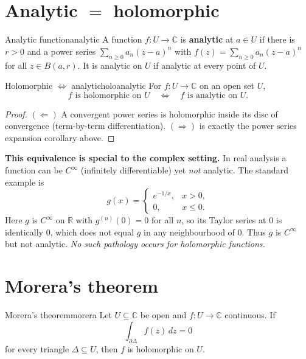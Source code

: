 \documentclass[11pt,openany]{report}
\newcommand{\C}{\mathbb{C}}
\newcommand{\R}{\mathbb{R}}
\begin{document}
\section{Analytic \texorpdfstring{$=$}{=} holomorphic}

\begin{definition}{Analytic function}{analytic}
A function $f:U\to\C$ is \textbf{analytic} at $a\in U$ if there is $r>0$ and a power series
$\sum_{n\ge0}a_n(z-a)^n$ with $f(z)=\sum_{n\ge0}a_n(z-a)^n$ for all $z\in B(a,r)$. It is
analytic on $U$ if analytic at every point of $U$.
\end{definition}

\begin{theorem}{Holomorphic $\Longleftrightarrow$ analytic}{holoanalytic}
For $f:U\to\C$ on an open set $U$,
\[
  f \text{ is holomorphic on } U \quad\Longleftrightarrow\quad f \text{ is analytic on } U .
\]
\end{theorem}

\begin{proof}
$(\Leftarrow)$ A convergent power series is holomorphic inside its disc of convergence
(term-by-term differentiation). $(\Rightarrow)$ is exactly the power series expansion
corollary above.
\end{proof}

\begin{caution}
\textbf{This equivalence is special to the complex setting.} In real analysis a function
can be $C^\infty$ (infinitely differentiable) yet \emph{not} analytic. The standard
example is
\[
  g(x) =
  \begin{cases}
    e^{-1/x}, & x>0,\\
    0, & x\le0.
  \end{cases}
\]
Here $g$ is $C^\infty$ on $\R$ with $g^{(n)}(0)=0$ for all $n$, so its Taylor series at $0$
is identically $0$, which does not equal $g$ in any neighbourhood of $0$. Thus $g$ is
$C^\infty$ but not analytic. \emph{No such pathology occurs for holomorphic functions.}
\end{caution}

\section{Morera's theorem}

\begin{theorem}{Morera's theorem}{morera}
Let $U\subseteq\C$ be open and $f:U\to\C$ continuous. If
\[
  \int_{\partial\Delta} f(z)\,dz = 0
\]
for every triangle $\Delta\subseteq U$, then $f$ is holomorphic on $U$.
\end{theorem}
\end{document}

